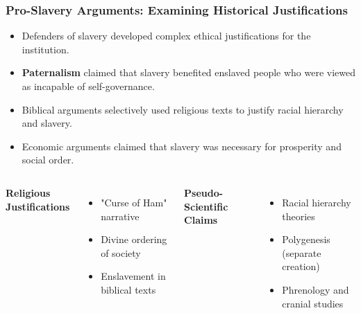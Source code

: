 \documentclass{beamer}
\begin{document}
	\begin{frame}
		\frametitle{Pro-Slavery Arguments: Examining Historical Justifications}
		
		\begin{itemize}
			\item Defenders of slavery developed complex ethical justifications for the institution.
			\item \textbf{Paternalism} claimed that slavery benefited enslaved people who were viewed as incapable of self-governance.
			\item Biblical arguments selectively used religious texts to justify racial hierarchy and slavery.
			\item Economic arguments claimed that slavery was necessary for prosperity and social order.
		\end{itemize}
		
		\begin{columns}
			\textbf{Religious Justifications}
			\begin{itemize}
				\item "Curse of Ham" narrative
				\item Divine ordering of society
				\item Enslavement in biblical texts
			\end{itemize}
			
			\textbf{Pseudo-Scientific Claims}
			\begin{itemize}
				\item Racial hierarchy theories
				\item Polygenesis (separate creation)
				\item Phrenology and cranial studies
			\end{itemize}
		\end{columns}
		
	\end{frame}
	
\end{document}
